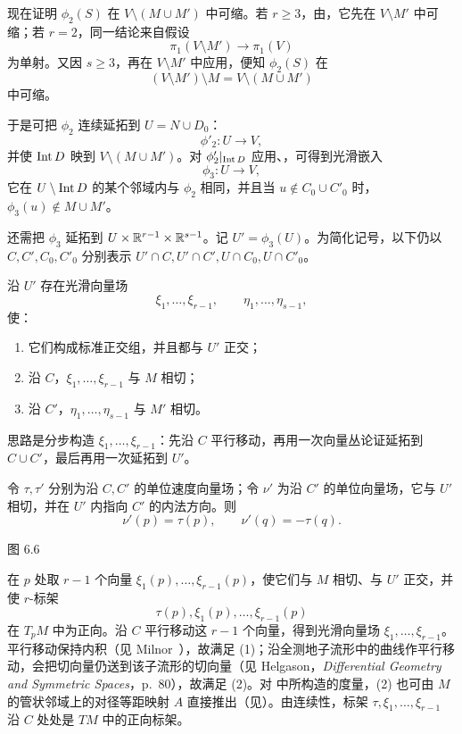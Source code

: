 现在证明 $\phi_2(S)$ 在 $V\setminus(M\cup M')$ 中可缩。若 $r\geq3$，由，它先在 $V\setminus M'$ 中可缩；若 $r=2$，同一结论来自假设
\[
  \pi_1(V\setminus M')\longrightarrow\pi_1(V)
\]
为单射。又因 $s\geq3$，再在 $V\setminus M'$ 中应用，便知 $\phi_2(S)$ 在
\[
  (V\setminus M')\setminus M=V\setminus(M\cup M')
\]
中可缩。

于是可把 $\phi_2$ 连续延拓到 $U=N\cup D_0$：
\[
  \phi'_2:U\longrightarrow V,
\]
并使 $\operatorname{Int} D$ 映到 $V\setminus(M\cup M')$。对 $\phi'_2|_{\operatorname{Int} D}$ 应用、，可得到光滑嵌入
\[
  \phi_3:U\longrightarrow V,
\]
它在 $U\setminus\operatorname{Int} D$ 的某个邻域内与 $\phi_2$ 相同，并且当
$u\notin C_0\cup C'_0$ 时，$\phi_3(u)\notin M\cup M'$。

还需把 $\phi_3$ 延拓到 $U\times\mathbb{R}^{r-1}\times\mathbb{R}^{s-1}$。记
$U'=\phi_3(U)$。为简化记号，以下仍以 $C,C',C_0,C'_0$ 分别表示
$U'\cap C,U'\cap C',U\cap C_0,U\cap C'_0$。

沿 $U'$ 存在光滑向量场
\[
  \xi_1,\ldots,\xi_{r-1},
  \qquad
  \eta_1,\ldots,\eta_{s-1},
\]
使：
\begin{enumerate}[label=\arabic*)]
  \item 它们构成标准正交组，并且都与 $U'$ 正交；
  \item 沿 $C$，$\xi_1,\ldots,\xi_{r-1}$ 与 $M$ 相切；
  \item 沿 $C'$，$\eta_1,\ldots,\eta_{s-1}$ 与 $M'$ 相切。
\end{enumerate}

\Proof 思路是分步构造 $\xi_1,\ldots,\xi_{r-1}$：先沿 $C$ 平行移动，再用一次向量丛论证延拓到 $C\cup C'$，最后再用一次延拓到 $U'$。

令 $\tau,\tau'$ 分别为沿 $C,C'$ 的单位速度向量场；令 $\nu'$ 为沿 $C'$ 的单位向量场，它与 $U'$ 相切，并在 $U'$ 内指向 $C'$ 的内法方向。则
\[
  \nu'(p)=\tau(p),
  \qquad
  \nu'(q)=-\tau(q).
\]

\begin{center}
  \FigSixSix

  \label{fig:6.6}图 6.6
\end{center}

在 $p$ 处取 $r-1$ 个向量 $\xi_1(p),\ldots,\xi_{r-1}(p)$，使它们与 $M$ 相切、与 $U'$ 正交，并使 $r$-标架
\[
  \tau(p),\xi_1(p),\ldots,\xi_{r-1}(p)
\]
在 $T_pM$ 中为正向。沿 $C$ 平行移动这 $r-1$ 个向量，得到光滑向量场 $\xi_1,\ldots,\xi_{r-1}$。平行移动保持内积（见 Milnor~\cite[p.~46]{ref04}），故满足 (1)；沿全测地子流形中的曲线作平行移动，会把切向量仍送到该子流形的切向量（见 Helgason，\emph{Differential Geometry and Symmetric Spaces}，p.~80），故满足 (2)。对 中所构造的度量，(2) 也可由 $M$ 的管状邻域上的对径等距映射 $A$ 直接推出（见）。由连续性，标架 $\tau,\xi_1,\ldots,\xi_{r-1}$ 沿 $C$ 处处是 $TM$ 中的正向标架。

